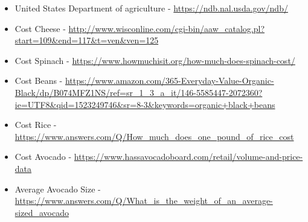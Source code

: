 \documentclass[paper=a4, fontsize=11pt]{scrartcl}
\numberwithin{equation}{section}		%
\numberwithin{figure}{section}			%
\numberwithin{table}{section}				%
\begin{document}
\begin{itemize}
\item United States Department of agriculture - \url{https://ndb.nal.usda.gov/ndb/}
\item Cost Cheese - \url{http://www.wisconline.com/cgi-bin/aaw_catalog.pl?start=109&end=117&t=ven&ven=125}
\item Cost Spinach - \url{https://www.howmuchisit.org/how-much-does-spinach-cost/}
\item Cost Beans - \url{https://www.amazon.com/365-Everyday-Value-Organic-Black/dp/B074MFZ1NS/ref=sr_1_3_a_it/146-5585447-2072360?ie=UTF8&qid=1523249746&sr=8-3&keywords=organic+black+beans}
\item Cost Rice - \url{https://www.answers.com/Q/How_much_does_one_pound_of_rice_cost}
\item Cost Avocado - \url{https://www.hassavocadoboard.com/retail/volume-and-price-data}
\item Average Avocado Size - \url{https://www.answers.com/Q/What_is_the_weight_of_an_average-sized_avocado}
  
\end{itemize}
\end{document}
